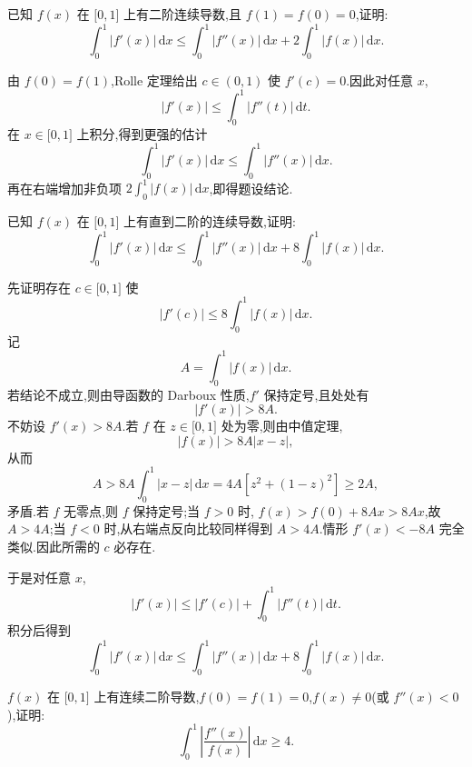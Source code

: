 \begin{example}
    已知 $f(x)$ 在 $\lbrack 0,1\rbrack$ 上有二阶连续导数,且 $f(1)=f(0)=0$,证明:
    \[
        \displaystyle\int_0^1|f'(x)|\,\mathrm{d}x
        \leq\int_0^1|f''(x)|\,\mathrm{d}x+2\int_0^1|f(x)|\,\mathrm{d}x.
    \]
\end{example}
\exampleblank

\begin{solution}
    由 $f(0)=f(1)$,Rolle 定理给出 $c\in(0,1)$ 使 $f'(c)=0$.因此对任意 $x$,
    \[
        |f'(x)|\leq\int_0^1|f''(t)|\,\mathrm{d}t.
    \]
    在 $x\in\lbrack0,1\rbrack$ 上积分,得到更强的估计
    \[
        \displaystyle\int_0^1|f'(x)|\,\mathrm{d}x
        \leq\int_0^1|f''(x)|\,\mathrm{d}x.
    \]
    再在右端增加非负项 $2\displaystyle\int_0^1|f(x)|\,\mathrm{d}x$,即得题设结论.
\end{solution}

\begin{example}
    已知 $f(x)$ 在 $\lbrack 0,1\rbrack$ 上有直到二阶的连续导数,证明:
    \[
        \displaystyle\int_0^1|f'(x)|\,\mathrm{d}x
        \leq\int_0^1|f''(x)|\,\mathrm{d}x+8\int_0^1|f(x)|\,\mathrm{d}x.
    \]
\end{example}
\exampleblank

\begin{solution}
    先证明存在 $c\in\lbrack0,1\rbrack$ 使
    \[
        |f'(c)|\leq8\int_0^1|f(x)|\,\mathrm{d}x.
    \]
    记
    \[
        A=\int_0^1|f(x)|\,\mathrm{d}x.
    \]
    若结论不成立,则由导函数的 Darboux 性质,$f'$ 保持定号,且处处有
    \[
        |f'(x)|>8A.
    \]
    不妨设 $f'(x)>8A$.若 $f$ 在 $z\in\lbrack0,1\rbrack$ 处为零,则由中值定理,
    \[
        |f(x)|>8A|x-z|,
    \]
    从而
    \[
        A>8A\int_0^1|x-z|\,\mathrm{d}x
        =4A\left[z^2+(1-z)^2\right]\geq2A,
    \]
    矛盾.若 $f$ 无零点,则 $f$ 保持定号;当 $f>0$ 时,
    $f(x)>f(0)+8Ax>8Ax$,故 $A>4A$;当 $f<0$ 时,从右端点反向比较同样得到 $A>4A$.情形 $f'(x)<-8A$ 完全类似.因此所需的 $c$ 必存在.

    于是对任意 $x$,
    \[
        |f'(x)|\leq|f'(c)|+\int_0^1|f''(t)|\,\mathrm{d}t.
    \]
    积分后得到
    \[
        \displaystyle\int_0^1|f'(x)|\,\mathrm{d}x
        \leq\int_0^1|f''(x)|\,\mathrm{d}x
        +8\int_0^1|f(x)|\,\mathrm{d}x.
    \]
\end{solution}

\begin{example}
    $f(x)$ 在 $\lbrack 0,1\rbrack$ 上有连续二阶导数,$f(0)=f(1)=0$,$f(x)\neq0$(或 $f''(x)<0$),证明:
    \[
        \displaystyle\int_0^1\left|\dfrac{f''(x)}{f(x)}\right|\,\mathrm{d}x\geq4.
    \]
\end{example}
\exampleblank

